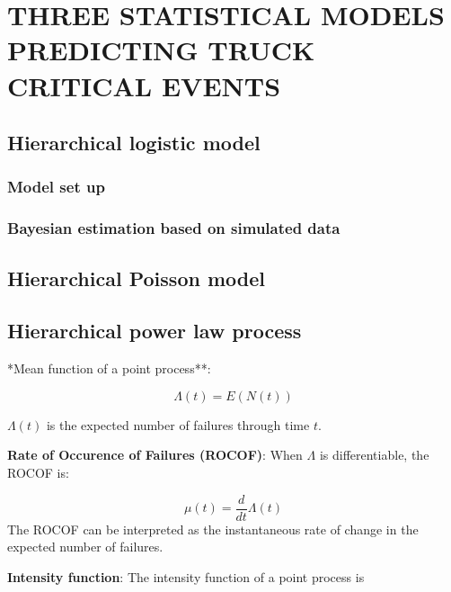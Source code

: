 \documentclass[12pt]{book}
\numberwithin{equation}{chapter}
\begin{document}
\hypertarget{three-statistical-models-predicting-truck-critical-events}{%
\chapter{THREE STATISTICAL MODELS PREDICTING TRUCK CRITICAL EVENTS}\label{three-statistical-models-predicting-truck-critical-events}}

\hypertarget{hierarchical-logistic-model}{%
\section{Hierarchical logistic model}\label{hierarchical-logistic-model}}

\hypertarget{model-set-up}{%
\subsection{Model set up}\label{model-set-up}}

\hypertarget{bayesian-estimation-based-on-simulated-data}{%
\subsection{Bayesian estimation based on simulated data}\label{bayesian-estimation-based-on-simulated-data}}

\hypertarget{hierarchical-poisson-model}{%
\section{Hierarchical Poisson model}\label{hierarchical-poisson-model}}

\hypertarget{hierarchical-power-law-process}{%
\section{Hierarchical power law process}\label{hierarchical-power-law-process}}

*Mean function of a point process**:

\[\Lambda(t) = E(N(t))\]

\(\Lambda(t)\) is the expected number of failures through time \(t\).

\textbf{Rate of Occurence of Failures (ROCOF)}: When \(\Lambda\) is differentiable, the ROCOF is:

\[\mu(t) = \frac{d}{dt}\Lambda(t)\]
The ROCOF can be interpreted as the instantaneous rate of change in the expected number of failures.

\textbf{Intensity function}: The intensity function of a point process is
\end{document}
